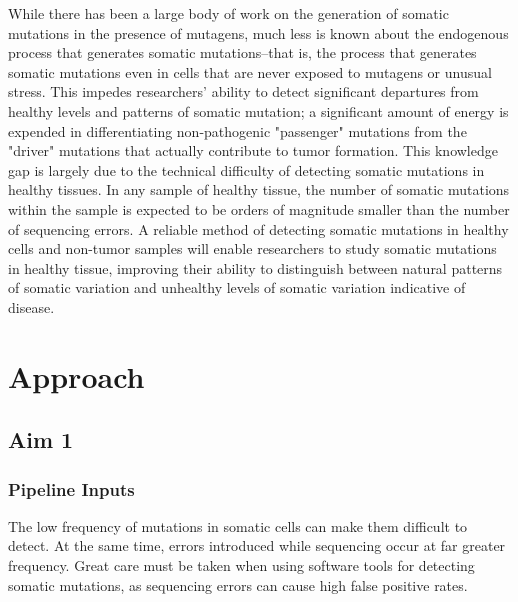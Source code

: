 While there has been a large body of work on the generation of somatic mutations in the presence of mutagens, much less is known about the endogenous process that generates somatic mutations--that is, the process that generates somatic mutations even in cells that are never exposed to mutagens or unusual stress.
This impedes researchers' ability to detect significant departures from healthy levels and patterns of somatic mutation; a significant amount of energy is expended in differentiating non-pathogenic "passenger" mutations from the "driver" mutations that actually contribute to tumor formation.
This knowledge gap is largely due to the technical difficulty of detecting somatic mutations in healthy tissues.
In any sample of healthy tissue, the number of somatic mutations within the sample is expected to be orders of magnitude smaller than the number of sequencing errors.
A reliable method of detecting somatic mutations in healthy cells and non-tumor samples will enable researchers to study somatic mutations in healthy tissue, improving their ability to distinguish between natural patterns of somatic variation and unhealthy levels of somatic variation indicative of disease.



\section{Approach}
\subsection{Aim 1}
\subsubsection{Pipeline Inputs}
The low frequency of mutations in somatic cells can make them difficult to detect.
At the same time, errors introduced while sequencing occur at far greater frequency.
Great care must be taken when using software tools for detecting somatic mutations, as sequencing errors can cause high false positive rates.

